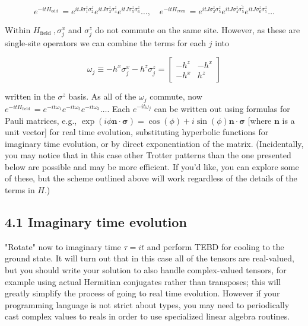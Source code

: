 \documentclass[12pt]{article}
\begin{document}
\begin{equation*}
e^{-i t H_{\text {odd }}}=e^{i t J \sigma_{1}^{z} \sigma_{2}^{z}} e^{i t J \sigma_{3}^{z} \sigma_{4}^{z}} e^{i t J \sigma_{5}^{z} \sigma_{6}^{z}} \ldots, \quad e^{-i t H_{\text {even }}}=e^{i t J \sigma_{2}^{z} \sigma_{5}^{z}} e^{i t J \sigma_{4}^{z} \sigma_{5}^{\tilde{z}}} e^{i t J \sigma_{6}^{z} \sigma_{7}^{z}} \ldots \tag{19}
\end{equation*}


Within $H_{\text {field }}, \sigma_{j}^{x}$ and $\sigma_{j}^{z}$ do not commute on the same site. However, as these are single-site operators we can combine the terms for each $j$ into

\[
\omega_{j} \equiv-h^{x} \sigma_{j}^{x}-h^{z} \sigma_{j}^{z}=\left[\begin{array}{cc}
-h^{z} & -h^{x}  \tag{20}\\
-h^{x} & h^{z}
\end{array}\right]
\]

written in the $\sigma^{z}$ basis. As all of the $\omega_{j}$ commute, now $e^{-i t H_{\text {field }}}=e^{-i t \omega_{1}} e^{-i t \omega_{2}} e^{-i t \omega_{3}} \ldots$. Each $e^{-i t \omega_{j}}$ can be written out using formulas for Pauli matrices, e.g., $\exp (i \phi \boldsymbol{n} \cdot \boldsymbol{\sigma})=\cos (\phi)+i \sin (\phi) \boldsymbol{n} \cdot \boldsymbol{\sigma}$ [where $\boldsymbol{n}$ is a unit vector] for real time evolution, substituting hyperbolic functions for imaginary time evolution, or by direct exponentiation of the matrix. (Incidentally, you may notice that in this case other Trotter patterns than the one presented below are possible and may be more efficient. If you'd like, you can explore some of these, but the scheme outlined above will work regardless of the details of the terms in $H$.)

\subsection*{4.1 Imaginary time evolution}
"Rotate" now to imaginary time $\tau=i t$ and perform TEBD for cooling to the ground state. It will turn out that in this case all of the tensors are real-valued, but you should write your solution to also handle complex-valued tensors, for example using actual Hermitian conjugates rather than transposes; this will greatly simplify the process of going to real time evolution. However if your programming language is not strict about types, you may need to periodically cast complex values to reals in order to use specialized linear algebra routines.
\end{document}
